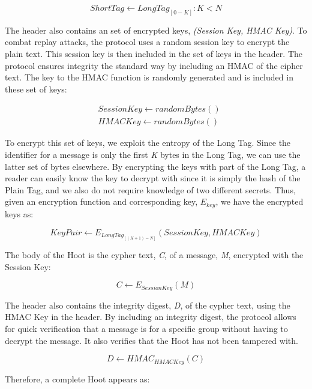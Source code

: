 \documentclass{acm_proc_article-sp}
\begin{document}
\begin{equation}
	ShortTag \leftarrow LongTag_{[0-K]} : K < N
\end{equation}

The header also contains an set of encrypted keys, \textit{(Session Key, HMAC Key)}. To combat replay attacks, the protocol uses a random session key to encrypt the plain text. This session key is then included in the set of keys in the header. The protocol ensures integrity the standard way by including an HMAC of the cipher text. The key to the HMAC function is randomly generated and is included in these set of keys: 

\begin{align}
	& SessionKey \leftarrow randomBytes() \\
	& HMACKey \leftarrow randomBytes()
\end{align}

To encrypt this set of keys, we exploit the entropy of the Long Tag. Since the identifier for a message is only the first \textit{K} bytes in the Long Tag, we can use the latter set of bytes elsewhere. By encrypting the keys with part of the Long Tag, a reader can easily know the key to decrypt with since it is simply the hash of the Plain Tag, and we also do not require knowledge of two different secrets. Thus, given an encryption function and corresponding key, \textit{$E_{key}$}, we have the encrypted keys as:

\begin{equation}
	KeyPair \leftarrow E_{LongTag_{[(K+1)-N]}}(SessionKey,HMACKey)
\end{equation}

The body of the Hoot is the cypher text, \textit{C}, of a message, \textit{M}, encrypted with the Session Key:

\begin{equation}
	C \leftarrow E_{SessionKey}(M)
\end{equation}

The header also contains the integrity digest, \textit{D}, of the cypher text, using the HMAC Key in the header. By including an integrity digest, the protocol allows for quick verification that a message is for a specific group without having to decrypt the message. It also verifies that the Hoot has not been tampered with. 

\begin{equation}
	D \leftarrow HMAC_{HMACKey}(C)
\end{equation}

Therefore, a complete Hoot appears as:
\end{document}
